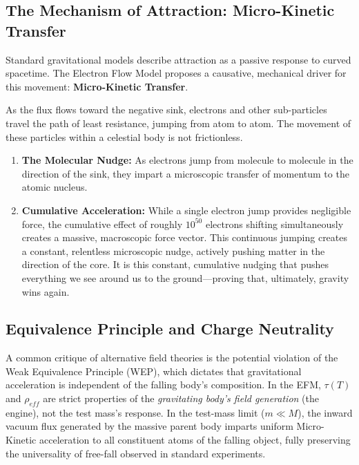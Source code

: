\documentclass[11pt, a4paper]{article}
\begin{document}
\subsection{The Mechanism of Attraction: Micro-Kinetic Transfer}
Standard gravitational models describe attraction as a passive response to curved spacetime. The Electron Flow Model proposes a causative, mechanical driver for this movement: \textbf{Micro-Kinetic Transfer}.

As the flux flows toward the negative sink, electrons and other sub-particles travel the path of least resistance, jumping from atom to atom. The movement of these particles within a celestial body is not frictionless.
\begin{enumerate}
  \item \textbf{The Molecular Nudge:} As electrons jump from molecule to molecule in the direction of the sink, they impart a microscopic transfer of momentum to the atomic nucleus.
  \item \textbf{Cumulative Acceleration:} While a single electron jump provides negligible force, the cumulative effect of roughly $10^{50}$ electrons shifting simultaneously creates a massive, macroscopic force vector. This continuous jumping creates a constant, relentless microscopic nudge, actively pushing matter in the direction of the core. It is this constant, cumulative nudging that pushes everything we see around us to the ground---proving that, ultimately, gravity wins again.
\end{enumerate}

\subsection{Equivalence Principle and Charge Neutrality}
A common critique of alternative field theories is the potential violation of the Weak Equivalence Principle (WEP), which dictates that gravitational acceleration is independent of the falling body's composition. In the EFM, $\tau(T)$ and $\rho_{eff}$ are strict properties of the \textit{gravitating body's field generation} (the engine), not the test mass's response. In the test-mass limit ($m \ll M$), the inward vacuum flux generated by the massive parent body imparts uniform Micro-Kinetic acceleration to all constituent atoms of the falling object, fully preserving the universality of free-fall observed in standard experiments.
\end{document}
